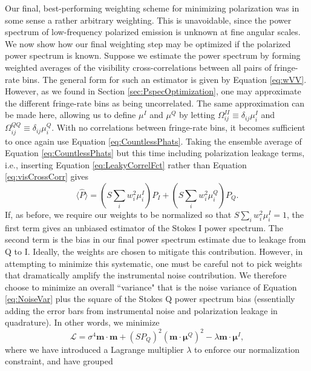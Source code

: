 \documentclass[twocolumn,apj,numberedappendix]{emulateapj}
\begin{document}
Our final, best-performing weighting scheme for minimizing polarization was in some sense a rather
arbitrary weighting. This is unavoidable, since the power spectrum of low-frequency polarized emission is unknown at fine angular scales. We now show how our final weighting step may be optimized if the
polarized power spectrum is known. Suppose we estimate the power spectrum by forming weighted averages of the visibility cross-correlations between all
pairs of fringe-rate bins. The general form for such an estimator is given by Equation \eqref{eq:wVV}. However,
as we found in Section \ref{sec:PspecOptimization}, one may approximate the different fringe-rate bins as being
uncorrelated. The same approximation can be made here, allowing us to define $\mu^I$ and $\mu^Q$ by
letting $\Omega_{ij}^{II} \equiv \delta_{ij} \mu_i^I$ and $\Omega_{ij}^{QQ} \equiv \delta_{ij} \mu_i^Q$. With no
correlations between fringe-rate bins, it becomes sufficient to once again use Equation \eqref{eq:CountlessPhats}.
Taking the ensemble average of Equation \eqref{eq:CountlessPhats} but this time including polarization leakage
terms, i.e., inserting Equation \eqref{eq:LeakyCorrelFct} rather than Equation \eqref{eq:visCrossCorr} gives
\begin{equation}
\langle \widehat{P} \rangle = \left( S \sum_i w_i^2 \mu^I_i \right) P_I + \left( S \sum_i w_i^2 \mu^Q_i \right) P_Q.
\end{equation}
If, as before, we require our weights to be normalized so that $S \sum_i w_i^2 \mu^I_i =1$, the first term gives an
unbiased estimator of the Stokes I power spectrum. The second term is the bias in our final power spectrum estimate
due to leakage from Q to I. Ideally, the weights are chosen to mitigate this contribution. However, in attempting to
minimize this systematic, one must be careful not to pick weights that dramatically amplify the instrumental noise
contribution. We therefore choose to minimize an overall ``variance" that is the noise variance of Equation
\eqref{eq:NoiseVar} plus the square of the Stokes Q power spectrum bias (essentially adding the error bars
from instrumental noise and polarization leakage in quadrature). In other words, we minimize
\begin{equation}
\mathcal L = \sigma^4 \mathbf{m} \cdot \mathbf{m} + \left(S P_Q \right)^2 \left(\mathbf{m} \cdot \boldsymbol \mu^Q \right)^2 - \lambda \mathbf{m} \cdot \boldsymbol \mu^I,
\end{equation}
where we have introduced a Lagrange multiplier $\lambda$ to enforce our normalization constraint, and have grouped
\end{document}
